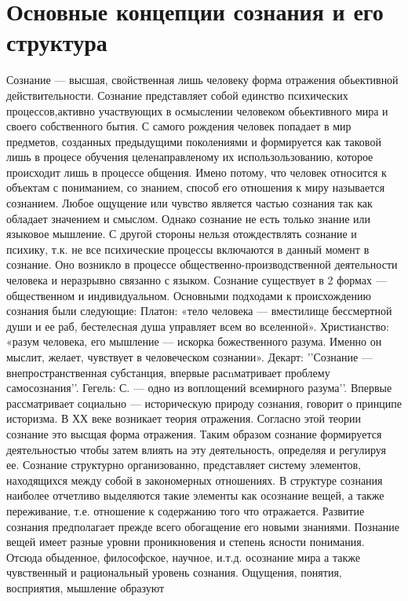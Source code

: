 \documentclass[12pt]{article}
\begin{document}
\section{Основные концепции сознания и его структура}
Сознание — высшая, свойственная лишь человеку форма отражения обьективной действительности. Сознание
представляет собой единство психических процессов,активно участвующих в осмыслении человеком
обьективного мира и своего собственного бытия. С самого рождения человек попадает в мир предметов,
созданных предыдущими поколениями и формируется как таковой лишь в процесе обучения целенаправленому
их использользованию, которое происходит лишь в процессе общения. Имено потому, что человек относится к
объектам с пониманием, со знанием, способ его отношения к миру называется сознанием. Любое ощущение
или чувство является частью сознания так как обладает значением и смыслом. Однако сознание не есть только
знание или языковое мышление. С другой стороны нельзя отождествлять сознание и психику, т.к. не все
психические процессы включаются в данный момент в сознание. Оно возникло в процессе общественно-производственной деятельности человека и неразрывно связанно с языком. Сознание существует в 2 формах —
общественном и индивидуальном. Основными подходами к происхождению сознания были следующие:
Платон: «тело человека — вместилище бессмертной души и ее раб, бестелесная душа управляет всем во
вселенной». Христианство: «разум человека, его мышление — искорка божественного разума. Именно он
мыслит, желает, чувствует в человеческом сознании». Декарт: ’’Сознание — внепространственная субстанция,
впервые расnматривает проблему самосознания’’. Гегель: С. — одно из воплощений всемирного разума’’.
Впервые рассматривает социально — историческую природу сознания, говорит о принципе историзма. В ХХ
веке возникает теория отражения. Согласно этой теории сознание это высщая форма отражения. Таким образом
сознание формируется деятельностью чтобы затем влиять на эту деятельность, определяя и регулируя ее.
Сознание структурно организованно, представляет систему элементов, находящихся между собой в
закономерных отношениях. В структуре сознания наиболее отчетливо выделяются такие элементы как
осознание вещей, а также переживание, т.е. отношение к содержанию того что отражается. Развитие сознания
предполагает прежде всего обогащение его новыми знаниями. Познание вещей имеет разные уровни
проникновения и степень ясности понимания. Отсюда обыденное, философское, научное, и.т.д. осознание мира
а также чувственный и рациональный уровень сознания. Ощущения, понятия, восприятия, мышление образуют
\end{document}
